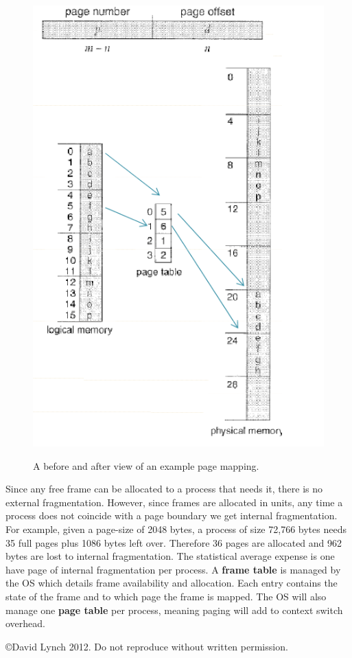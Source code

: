 \documentclass[10pt,a4paper]{article}
\begin{document}
\begin{figure}
\caption{A before and after view of an example page mapping. \cite{OSCONCEPTS}}
\begin{center}
\includegraphics[scale=0.45]{../images/page-mapping.png}
\label{page mapping}
\end{center}
\end{figure}
Since any free frame can be allocated to a process that needs it, there is no external fragmentation. However, since frames are allocated in units, any time a process does not coincide with a page boundary we get internal fragmentation. For example, given a page-size of 2048 bytes, a process of size 72,766 bytes needs 35 full pages plus 1086 bytes left over. Therefore 36 pages are allocated and 962 bytes are lost to internal fragmentation. The statistical average expense is one have page of internal fragmentation per process. 
\newline\newline
A {\bf frame table} is managed by the OS which details frame availability and allocation. Each entry contains the state of the frame and to which page the frame is mapped. The OS will also manage one {\bf page table} per process, meaning paging will add to context switch overhead. 


{}

\begin{center}
{\small \copyright  David Lynch 2012. Do not reproduce without written permission.}
\end{center}
\end{document}
